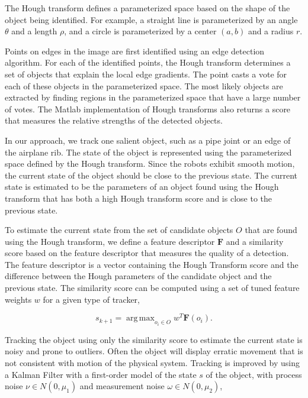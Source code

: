 \documentclass[letterpaper, 10 pt, conference]{ieeeconf}
\DeclareMathOperator*{\argmax}{arg\,max}
\begin{document}
The Hough transform defines a parameterized space based on the shape of the object being identified. For example, a straight line is parameterized by an angle $\theta$ and a length $\rho$, and a circle is parameterized by a center $(a, b)$ and a radius $r$.

Points on edges in the image are first identified using an edge detection algorithm. For each of the identified points, the Hough transform determines a set of objects that explain the local edge gradients. The point casts a vote for each of these objects in the parameterized space. The most likely objects are extracted by finding regions in the parameterized space that have a large number of votes. The Matlab implementation of Hough transforms also returns a score that measures the relative strengths of the detected objects.

In our approach, we track one salient object, such as a pipe joint or an edge of the airplane rib. The state of the object is represented using the parameterized space defined by the Hough transform.  Since the robots exhibit smooth motion, the current state of the object should be close to the previous state. The current state is estimated to be the parameters of an object found using the Hough transform that has both a high Hough transform score and is close to the previous state.

To estimate the current state from the set of candidate objects $O$ that are found using the Hough transform, we define a feature descriptor $\textbf{F}$ and a similarity score based on the feature descriptor that measures the quality of a detection. The feature descriptor is a vector containing the Hough Transform score and the difference between the Hough parameters of the candidate object and the previous state. The similarity score can be computed using a set of tuned feature weights $w$ for a given type of tracker,

\begin{equation}
	s_{k+1} = \argmax_{o_i \in O} w^T \textbf{F}(o_i).
\end{equation}

Tracking the object using only the similarity score to estimate the current state is noisy and prone to outliers. Often the object will display erratic movement that is not consistent with motion of the physical system. Tracking is improved by using a Kalman Filter with a first-order model of the state $s$ of the object, with process noise $\nu \in N(0, \mu_1)$ and measurement noise $\omega \in N(0, \mu_2)$,
\end{document}
